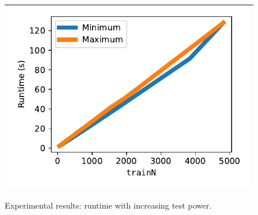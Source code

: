 \documentclass[compsoc, conference, a4paper, 10pt, times]{IEEEtran}
\begin{document}
\begin{figure}
  \label{fig:linear-time}
  \centering
  \newcommand{\gsize}{.38\textwidth}
\begin{tabular}{c}
    \hline\hline
    \includegraphics[width=\gsize]{graphs/asymptote_time.pdf} \\
    \hline
    \hline
\end{tabular}
\caption{Experimental results: runtime with increasing test power.}
\end{figure}
\end{document}

